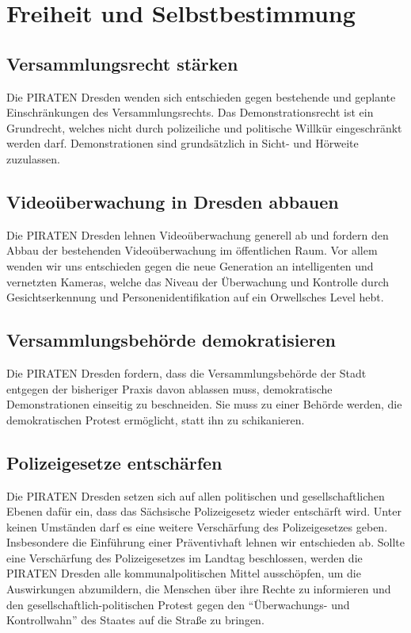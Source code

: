 \documentclass[a4paper, 11pt]{article}
\begin{document}
\section{Freiheit und Selbstbestimmung}

\subsection{Versammlungsrecht stärken}
Die PIRATEN Dresden wenden sich entschieden gegen bestehende und geplante Einschränkungen des Versammlungsrechts. Das Demonstrationsrecht ist ein Grundrecht, welches nicht durch polizeiliche und politische Willkür eingeschränkt werden darf. Demonstrationen sind grundsätzlich in Sicht- und Hörweite zuzulassen.


\subsection{Videoüberwachung in Dresden abbauen}
Die PIRATEN Dresden lehnen Videoüberwachung generell ab und fordern den Abbau der bestehenden Videoüberwachung im öffentlichen Raum. Vor allem wenden wir uns entschieden gegen die neue Generation an intelligenten und vernetzten Kameras, welche das Niveau der Überwachung und Kontrolle durch Gesichtserkennung und Personenidentifikation auf ein Orwellsches Level hebt.




\subsection{Versammlungsbehörde demokratisieren}
Die PIRATEN Dresden fordern, dass die Versammlungsbehörde der Stadt entgegen der bisheriger Praxis davon ablassen muss, demokratische Demonstrationen einseitig zu beschneiden. Sie muss zu einer Behörde werden, die demokratischen Protest ermöglicht, statt ihn zu schikanieren.


\subsection{Polizeigesetze entschärfen}
Die PIRATEN Dresden setzen sich auf allen politischen und gesellschaftlichen Ebenen dafür ein, dass das Sächsische Polizeigesetz wieder entschärft wird. Unter keinen Umständen darf es eine weitere Verschärfung des Polizeigesetzes geben. Insbesondere die Einführung einer Präventivhaft lehnen wir entschieden ab. Sollte eine Verschärfung des Polizeigesetzes im Landtag beschlossen, werden die PIRATEN Dresden alle kommunalpolitischen Mittel ausschöpfen, um die Auswirkungen abzumildern, die Menschen über ihre Rechte zu informieren und den gesellschaftlich-politischen Protest gegen den ``Überwachungs- und Kontrollwahn'' des Staates auf die Straße zu bringen.
\end{document}
